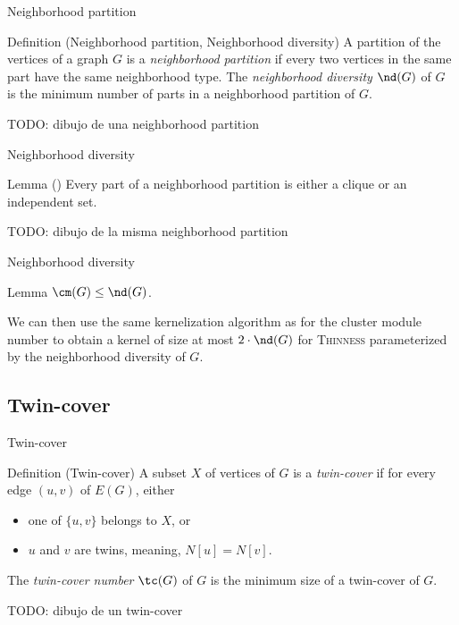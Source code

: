 \documentclass{beamer}
\begin{document}
\begin{frame}{Neighborhood partition}
    \begin{block}{Definition (Neighborhood partition, Neighborhood diversity)}
        A partition of the vertices of a graph $G$ is a \emph{neighborhood partition} if every two vertices in the same part have the same neighborhood type. The \emph{neighborhood diversity} $\nd(G)$ of $G$ is the minimum number of parts in a neighborhood partition of $G$.
    \end{block}
    TODO: dibujo de una neighborhood partition
\end{frame}

\begin{frame}{Neighborhood diversity}
    \begin{block}{Lemma (\cite{neighborhood-diversity})}
        Every part of a neighborhood partition is either a clique or an independent set.
    \end{block}

    TODO: dibujo de la misma neighborhood partition
\end{frame}

\begin{frame}{Neighborhood diversity}
    \begin{block}{Lemma}
        $\cm(G) \leq \nd(G)$.
    \end{block}
    \pause
    \vspace{1em}
    We can then use the same kernelization algorithm as for the cluster module number to obtain a kernel of size at most $2 \cdot \nd(G)$ for \textsc{Thinness} parameterized by the neighborhood diversity of $G$.
\end{frame}

\subsection{Twin-cover}
\begin{frame}{Twin-cover}
    \begin{block}{Definition (Twin-cover)}
        A subset $X$ of vertices of $G$ is a \emph{twin-cover} if for every edge $(u, v)$ of $E(G)$, either
        \begin{itemize}
            \item one of $\{u, v\}$ belongs to $X$, or
            \item $u$ and $v$ are twins, meaning, $N[u] = N[v]$.
        \end{itemize}

        The \emph{twin-cover number} $\tc(G)$ of $G$ is the minimum size of a twin-cover of $G$.
    \end{block}

    TODO: dibujo de un twin-cover
\end{frame}
\end{document}
